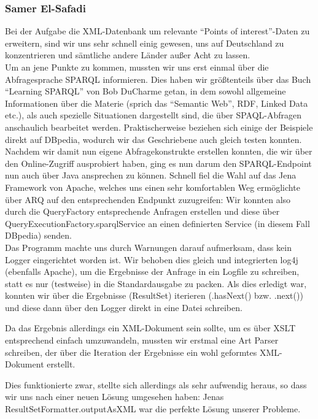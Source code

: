 \subsubsection{Samer El-Safadi}
Bei der Aufgabe die XML-Datenbank um relevante "`Points of interest"'-Daten
zu erweitern, sind wir uns sehr schnell einig gewesen, uns auf Deutschland
zu konzentrieren und sämtliche andere Länder außer Acht zu lassen.\\

Um an jene Punkte zu kommen, mussten wir uns erst einmal über die
Abfragesprache SPARQL informieren. Dies haben wir größtenteils über das
Buch "`Learning SPARQL"' von Bob DuCharme getan, in dem sowohl allgemeine
Informationen über die Materie (sprich das "`Semantic Web"', RDF, Linked
Data etc.), als auch spezielle Situationen dargestellt sind, die über
SPAQL-Abfragen anschaulich bearbeitet werden. Praktischerweise beziehen
sich einige der Beispiele direkt auf DBpedia, wodurch wir das Geschriebene
auch gleich testen konnten.\\

Nachdem wir damit nun eigene Abfragekonstrukte erstellen konnten, die wir
über den Online-Zugriff ausprobiert haben, ging es nun darum den
SPARQL-Endpoint nun auch über Java ansprechen zu können. Schnell fiel die
Wahl auf das Jena Framework von Apache, welches uns einen sehr
komfortablen Weg ermöglichte über ARQ auf den entsprechenden Endpunkt
zuzugreifen: Wir konnten also durch die QueryFactory entsprechende
Anfragen erstellen und diese über QueryExecutionFactory.sparqlService an
einen definierten Service (in diesem Fall DBpedia) senden.\\

Das Programm machte uns durch Warnungen darauf aufmerksam, dass kein
Logger eingerichtet worden ist. Wir behoben dies gleich und integrierten
log4j (ebenfalls Apache), um die Ergebnisse der Anfrage in ein Logfile zu
schreiben, statt es nur (testweise) in die Standardausgabe zu packen.
Als dies erledigt war, konnten wir über die Ergebnisse (ResultSet)
iterieren (.hasNext() bzw. .next()) und diese dann über den Logger direkt
in eine Datei schreiben.

Da das Ergebnis allerdings ein XML-Dokument sein sollte, um es über XSLT
entsprechend einfach umzuwandeln, mussten wir erstmal eine Art Parser
schreiben, der über die Iteration der Ergebnisse ein wohl geformtes
XML-Dokument erstellt.

Dies funktionierte zwar, stellte sich allerdings als sehr aufwendig
heraus, so dass wir uns nach einer neuen Lösung umgesehen haben: Jenas
ResultSetFormatter.outputAsXML war die perfekte Lösung unserer Probleme.\\

